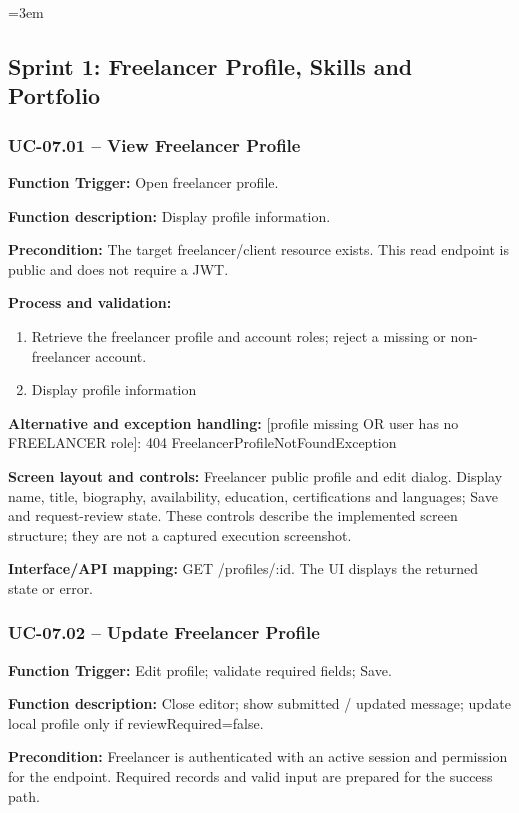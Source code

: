 \begingroup\sloppy\emergencystretch=3em\relax
\subsection{Sprint 1: Freelancer Profile, Skills and Portfolio}

\subsubsection{UC-07.01 -- View Freelancer Profile}
\textbf{Function Trigger:} Open freelancer profile.

\textbf{Function description:} Display profile information.

\textbf{Precondition:} The target freelancer/\allowbreak{}client resource exists. This read endpoint is public and does not require a JWT.

\textbf{Process and validation:}
\begin{enumerate}
\item Retrieve the freelancer profile and account roles; reject a missing or non-freelancer account.
\item Display profile information
\end{enumerate}
\textbf{Alternative and exception handling:} [profile missing OR user has no FREELANCER role]: 404 Freelancer\allowbreak{}Profile\allowbreak{}Not\allowbreak{}Found\allowbreak{}Exception

\textbf{Screen layout and controls:} Freelancer public profile and edit dialog. Display name, title, biography, availability, education, certifications and languages; Save and request-review state. These controls describe the implemented screen structure; they are not a captured execution screenshot.

\textbf{Interface/\allowbreak{}API mapping:} GET /\allowbreak{}profiles/\allowbreak{}:id. The UI displays the returned state or error.

\subsubsection{UC-07.02 -- Update Freelancer Profile}
\textbf{Function Trigger:} Edit profile; validate required fields; Save.

\textbf{Function description:} Close editor; show submitted /\allowbreak{} updated message; update local profile only if review\allowbreak{}Required=\allowbreak{}false.

\textbf{Precondition:} Freelancer is authenticated with an active session and permission for the endpoint. Required records and valid input are prepared for the success path.

